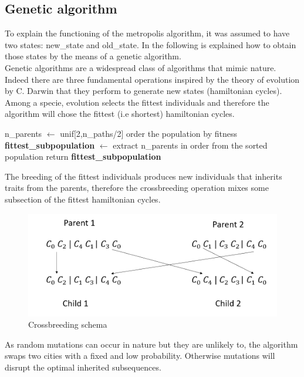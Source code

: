 \documentclass{article}
\begin{document}
\subsection{Genetic algorithm}
To explain the functioning of the metropolis algorithm, it was assumed to have two states: new\_state and old\_state. In the following is explained how to obtain those states by the means of a genetic algorithm.\\
Genetic algorithms are a widespread class of algorithms that mimic nature. Indeed there are three fundamental operations  inspired by the theory of evolution by C. Darwin that they perform to generate new states (hamiltonian cycles). \\
Among a specie, evolution selects the fittest individuals and therefore the algorithm will chose the fittest (i.e shortest) hamiltonian cycles. \\
\begin{algorithm}[H]
    \begin{algorithmic}[1]
        \State n\_parents $\leftarrow$ unif[2,n\_paths/2]
        \State order the population by fitness
        \State \textbf{fittest\_subpopulation} $\leftarrow$ extract n\_parents in order from the sorted population
        \State return \textbf{fittest\_subpopulation}
       \EndFunction
\end{algorithmic}
\end{algorithm}
\noindent The breeding of the fittest individuals produces new individuals that inherits traits from the parents, therefore the crossbreeding operation mixes some subsection of the fittest hamiltonian cycles. \\
\begin{figure}[H]\includegraphics[scale=0.5]{crossbreeding.png} 
\centering
\caption{Crossbreeding schema}
\end{figure}

\noindent As random mutations can occur in nature but they are unlikely to, the algorithm swaps two cities with a fixed and low probability. Otherwise mutations will disrupt the optimal inherited subsequences. \\
\end{document}
